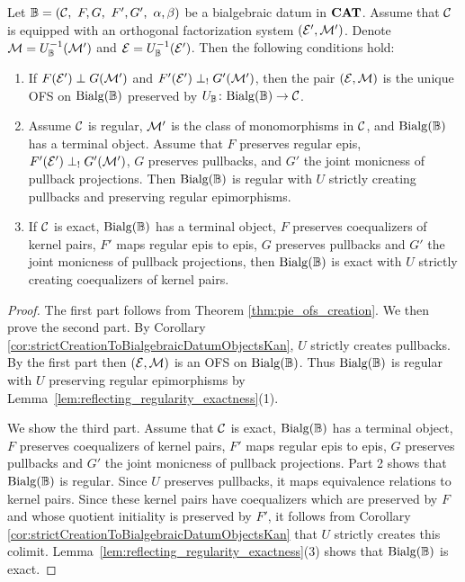 \begin{theorem}\label{thm:liftingregularexact}
    Let $\mathbb{B} = (\mathcal{C},\ F,G,\ F',G',\ \alpha,\beta)$ be a bialgebraic datum in $\mathbf{CAT}$. Assume that $\mathcal{C}$ is equipped with an orthogonal factorization system $(\mathcal{E}',\mathcal{M}')$. Denote $\mathcal{M} = U_{\mathbb{B}}^{-1}(\mathcal{M}')$ and $\mathcal{E} = U_{\mathbb{B}}^{-1}(\mathcal{E}')$. Then the following conditions hold:
    \begin{enumerate}
        \item If $F(\mathcal{E}')\perp G(\mathcal{M}')$ and $F'(\mathcal{E}')\perp_! G'(\mathcal{M}')$, then the pair $(\mathcal{E},\mathcal{M})$ is the unique OFS on $\mathrm{Bialg}(\mathbb{B})$ preserved by $U_{\mathbb{B}}\colon \mathrm{Bialg}(\mathbb{B})\to \mathcal{C}$.
        \item Assume $\mathcal{C}$ is regular, $\mathcal{M}'$ is the class of monomorphisms in $\mathcal{C}$, and $\mathrm{Bialg}(\mathbb{B})$ has a terminal object. Assume that $F$ preserves regular epis, $F'(\mathcal{E}')\perp_! G'(\mathcal{M}')$, $G$ preserves pullbacks, and $G'$ the joint monicness of pullback projections. Then $\mathrm{Bialg}(\mathbb{B})$ is regular with $U$ strictly creating pullbacks and preserving regular epimorphisms.
        \item If $\mathcal{C}$ is exact, $\mathrm{Bialg}(\mathbb{B})$ has a terminal object, $F$ preserves coequalizers of kernel pairs, $F'$ maps regular epis to epis, $G$ preserves pullbacks and $G'$ the joint monicness of pullback projections, then $\mathrm{Bialg}(\mathbb{B})$ is exact with $U$ strictly creating coequalizers of kernel pairs.
    \end{enumerate}
\end{theorem}
\begin{proof}
    The first part follows from Theorem \ref{thm:pie_ofs_creation}. We then prove the second part. By Corollary \ref{cor:strictCreationToBialgebraicDatumObjectsKan}, $U$ strictly creates pullbacks. By the first part then $(\mathcal{E},\mathcal{M})$ is an OFS on $\mathrm{Bialg}(\mathbb{B})$. Thus $\mathrm{Bialg}(\mathbb{B})$ is regular with $U$ preserving regular epimorphisms by Lemma~\ref{lem:reflecting_regularity_exactness}(1).

    We show the third part. Assume that $\mathcal{C}$ is exact, $\mathrm{Bialg}(\mathbb{B})$ has a terminal object, $F$ preserves coequalizers of kernel pairs, $F'$ maps regular epis to epis, $G$ preserves pullbacks and $G'$ the joint monicness of pullback projections. Part 2 shows that $\mathrm{Bialg}(\mathbb{B})$ is regular. Since $U$ preserves pullbacks, it maps equivalence relations to kernel pairs. Since these kernel pairs have coequalizers which are preserved by $F$ and whose quotient initiality is preserved by $F'$, it follows from Corollary \ref{cor:strictCreationToBialgebraicDatumObjectsKan} that $U$ strictly creates this colimit. Lemma~\ref{lem:reflecting_regularity_exactness}(3) shows that $\mathrm{Bialg}(\mathbb{B})$ is exact.
\end{proof}

